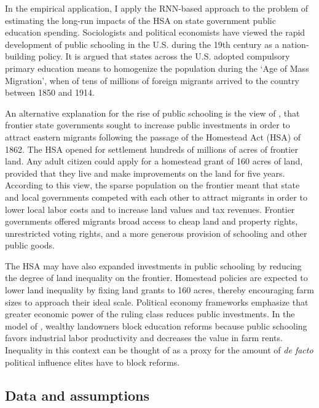 In the empirical application, I apply the RNN-based approach to the problem of estimating the long-run impacts of the HSA on state government public education spending. Sociologists and political economists \citep[e.g,][]{meyer1979public,alesina2013nation,bandiera2018nation} have viewed the rapid development of public schooling in the U.S. during the 19th century as a nation-building policy. It is argued that states across the U.S. adopted compulsory primary education means to homogenize the population during the `Age of Mass Migration', when of tens of millions of foreign migrants arrived to the country between 1850 and 1914. 

An alternative explanation for the rise of public schooling is the view of \citet{engerman2005evolution}, that frontier state governments sought to increase public investments in order to attract eastern migrants following the passage of the Homestead Act (HSA) of 1862. The HSA opened for settlement hundreds of millions of acres of frontier land. Any adult citizen could apply for a homestead grant of 160 acres of land, provided that they live and make improvements on the land for five years.  According to this view, the sparse population on the frontier meant that state and local governments competed with each other to attract migrants in order to lower local labor costs and to increase land values and tax revenues. Frontier governments offered migrants broad access to cheap land and property rights, unrestricted voting rights, and a more generous provision of schooling and other public goods.

The HSA may have also expanded investments in public schooling by reducing the degree of land inequality on the frontier. Homestead policies are expected to lower land inequality by fixing land grants to 160 acres, thereby encouraging farm sizes to approach their ideal scale. Political economy frameworks \citep[e.g.,][]{acemoglu2008persistence, besley2009origins} emphasize that greater economic power of the ruling class reduces public investments. In the model of \citet{galor2009inequality}, wealthy landowners block education reforms because public schooling favors industrial labor productivity and decreases the value in farm rents. Inequality in this context can be thought of as a proxy for the amount of \emph{de facto} political influence elites have to block reforms.

\subsection{Data and assumptions} \label{educ-data}

